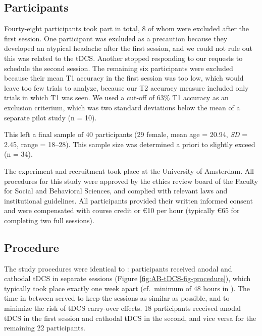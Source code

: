 \documentclass[11pt,]{memoir}
\begin{document}
\hypertarget{AB_tDCS-participants}{%
\subsection{Participants}\label{AB_tDCS-participants}}

Fourty-eight participants took part in total, 8 of whom were excluded after the first session. One participant was excluded as a precaution because they developed an atypical headache after the first session, and we could not rule out this was related to the tDCS. Another stopped responding to our requests to schedule the second session. The remaining six participants were excluded because their mean T1 accuracy in the first session was too low, which would leave too few trials to analyze, because our T2 accuracy measure included only trials in which T1 was seen. We used a cut-off of 63\% T1 accuracy as an exclusion criterium, which was two standard deviations below the mean of a separate pilot study (n = 10).

This left a final sample of 40 participants (29 female, mean age = 20.94, \emph{SD} = 2.45, range = 18--28). This sample size was determined a priori to slightly exceed \textcite{London2015} (n = 34).

The experiment and recruitment took place at the University of Amsterdam. All procedures for this study were approved by the ethics review board of the Faculty for Social and Behavioral Sciences, and complied with relevant laws and institutional guidelines. All participants provided their written informed consent and were compensated with course credit or €10 per hour (typically €65 for completing two full sessions).

\hypertarget{AB_tDCS-procedure}{%
\subsection{Procedure}\label{AB_tDCS-procedure}}

The study procedures were identical to \textcite{London2015}: participants received anodal and cathodal tDCS in separate sessions (Figure \ref{fig:AB-tDCS-fig-procedure}), which typically took place exactly one week apart (cf.~minimum of 48 hours in \textcite{London2015}). The time in between served to keep the sessions as similar as possible, and to minimize the risk of tDCS carry-over effects. 18 participants received anodal tDCS in the first session and cathodal tDCS in the second, and vice versa for the remaining 22 participants.
\end{document}
